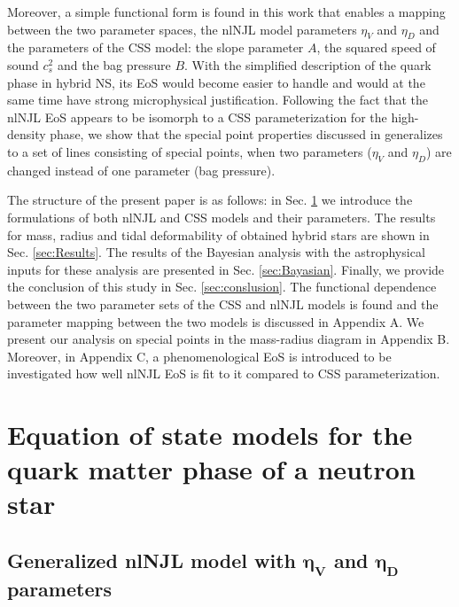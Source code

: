 \documentclass[%
 reprint,
superscriptaddress,
nofootinbib,
 amsmath,amssymb,
 aps,
]{revtex4-1}
\begin{document}
Moreover, a simple functional form is found in this work that enables a mapping between the two parameter spaces, the nlNJL model parameters $\eta_V$ and $\eta_D$ and the parameters of the CSS model: the slope parameter $A$, the squared speed of sound $c_s^2$ and the bag pressure $B$. 
With the simplified description of the quark phase in hybrid NS, its EoS would become easier to handle and would at the same time have strong microphysical justification. %
{Following the fact that the nlNJL 
EoS appears to be isomorph to a CSS parameterization for the high-density phase, we show that the special point properties discussed in \cite{Yudin:2014mla} generalizes to a set of lines consisting of special points, when two parameters ($\eta_V$ and $\eta_D$) are changed instead of one parameter (bag pressure).}

The structure of the present paper is as follows: in Sec. \ref{sec:EOSmodels} we introduce the formulations of both nlNJL and CSS models and their parameters. %
The results for mass, radius and tidal deformability of obtained hybrid stars are shown in Sec. \ref{sec:Results}. The results of the Bayesian analysis with the astrophysical inputs for these analysis are presented in Sec. \ref{sec:Bayasian}.  
Finally, we provide the conclusion of this study in Sec. \ref{sec:conslusion}. The functional dependence between the two parameter sets of the CSS and nlNJL models is found and the parameter mapping between the two models is discussed in Appendix A. 
We present our analysis on special points in the mass-radius diagram in Appendix B. Moreover, in Appendix C, a phenomenological EoS is introduced to be investigated how well nlNJL EoS is fit to it compared to CSS parameterization.


\section{Equation of state models for the quark matter phase of a neutron star} \label{sec:EOSmodels}
\subsection{Generalized nlNJL model with $\mathbf{\eta_V}$ and $\mathbf{\eta_D}$ parameters }
\end{document}
